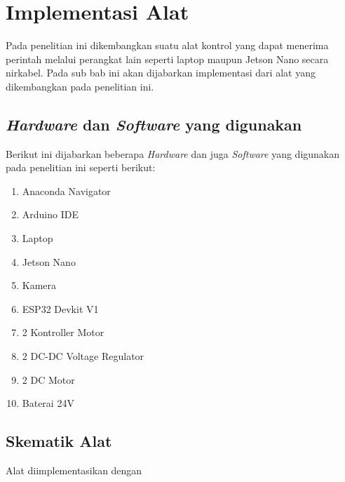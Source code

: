 \section{Implementasi Alat}
\label{sec:implementasi alat}

Pada penelitian ini dikembangkan suatu alat kontrol yang dapat menerima perintah melalui perangkat lain seperti laptop maupun Jetson Nano secara nirkabel. Pada sub bab ini akan dijabarkan implementasi dari alat yang dikembangkan pada penelitian ini.

\subsection{\emph{Hardware} dan \emph{Software} yang digunakan}
Berikut ini dijabarkan beberapa \emph{Hardware} dan juga \emph{Software} yang digunakan pada penelitian ini seperti berikut:
\begin{enumerate}
    \item Anaconda Navigator
    \item Arduino IDE 
    \item Laptop 
    \item Jetson Nano
    \item Kamera
    \item ESP32 Devkit V1
    \item 2 Kontroller Motor
    \item 2 DC-DC Voltage Regulator
    \item 2 DC Motor
    \item Baterai 24V
\end{enumerate}

\subsection{Skematik Alat}


Alat diimplementasikan dengan \lipsum[1]


\lipsum[2-3]



\lipsum[4]
